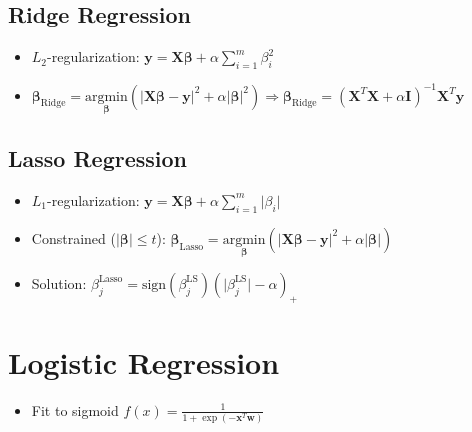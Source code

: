 \documentclass[11pt]{article}
\begin{document}
\newpage
\hypertarget{ridge-regression}{%
\subsection{Ridge Regression}\label{ridge-regression}}

\begin{itemize}
    \item $L_2$-regularization: $\boldsymbol{y} = \boldsymbol{X}\boldsymbol{\beta} + \alpha\sum_{i=1}^m\beta^2_i$
    \item $\boldsymbol{\beta}_{\text{Ridge}} = \underset{\boldsymbol{\beta}}{\text{arg}\text{min}}\left({\big|}\boldsymbol{X}\boldsymbol{\beta} - \boldsymbol{y}{\big|}^2 + \alpha{\big|}\boldsymbol{\beta}{\big|}^2\right) \Rightarrow \boldsymbol{\beta}_{\text{Ridge}} = \left(\boldsymbol{X}^T\boldsymbol{X} + \alpha \boldsymbol{I}\right)^{-1}\boldsymbol{X}^T\boldsymbol{y}$
\end{itemize}

\newpage
\hypertarget{lasso-regression}{%
\subsection{Lasso Regression}\label{lasso-regression}}

\begin{itemize}
    \item $L_1$-regularization: $\boldsymbol{y} = \boldsymbol{X}\boldsymbol{\beta} + \alpha\sum_{i=1}^m{\big|}\beta_i{\big|}$
    \item Constrained ($|\boldsymbol{\beta}|\leq t$): $\boldsymbol{\beta}_{\text{Lasso}} = \underset{\boldsymbol{\beta}}{\text{arg}\text{min}}\left({\big|}\boldsymbol{X}\boldsymbol{\beta} - \boldsymbol{y}{\big|}^2 + \alpha{\big|}\boldsymbol{\beta}{\big|}\right)$
    \item Solution: $\beta^{\text{Lasso}}_j = \text{sign}\left(\beta^{\text{LS}}_j\right)\left({\big|}\beta^{\text{LS}}_j{\big|} - \alpha\right)_+$
\end{itemize}


\newpage
\hypertarget{logistic-regression}{%
\section{Logistic Regression}\label{logistic-regression}}

\begin{itemize}
    \item Fit to sigmoid $f(x) = \frac{1}{1 + \exp(-\boldsymbol{x}^T\boldsymbol{w})}$
\end{itemize}
\begin{center}
\end{center}
{ \hspace*{\fill} \\}
\end{document}
